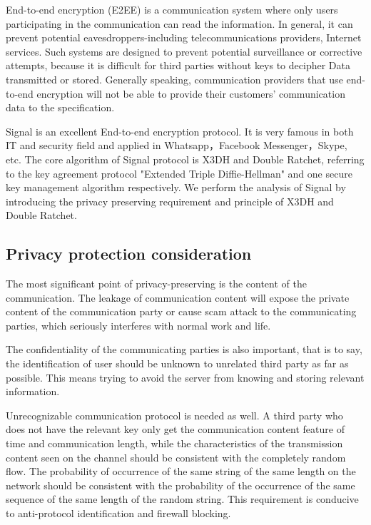 \documentclass[11pt,en]{elegantpaper}
\begin{document}
End-to-end encryption (E2EE) is a communication system where only users participating in the communication can read the information. In general, it can prevent potential eavesdroppers-including telecommunications providers, Internet services. Such systems are designed to prevent potential surveillance or corrective attempts, because it is difficult for third parties without keys to decipher Data transmitted or stored. Generally speaking, communication providers that use end-to-end encryption will not be able to provide their customers' communication data to the specification.

Signal is an excellent End-to-end encryption protocol.\cite{alwen2019double} It is very famous in both IT and security field and applied in Whatsapp，Facebook Messenger，Skype, etc. The core algorithm of Signal protocol is X3DH and Double Ratchet, referring to the key agreement protocol "Extended Triple Diffie-Hellman" and one secure key management algorithm respectively.
We perform the analysis of Signal by introducing the privacy preserving requirement and principle of X3DH and Double Ratchet.

\subsection{Privacy protection consideration}
The most significant point of privacy-preserving is the content of the communication. The leakage of communication content will expose the private content of the communication party or cause scam attack to the communicating parties, which seriously interferes with normal work and life.

The confidentiality of the communicating parties is also important, that is to say, the identification of user should be unknown to unrelated third party as far as possible. This means trying to avoid the server from knowing and storing relevant information.

Unrecognizable communication protocol is needed as well. A third party who does not have the relevant key only get the communication content feature of time and communication length, while the characteristics of the transmission content seen on the channel should be consistent with the completely random flow. The probability of occurrence of the same string of the same length on the network should be consistent with the probability of the occurrence of the same sequence of the same length of the random string. This requirement is conducive to anti-protocol identification and firewall blocking.
\end{document}
